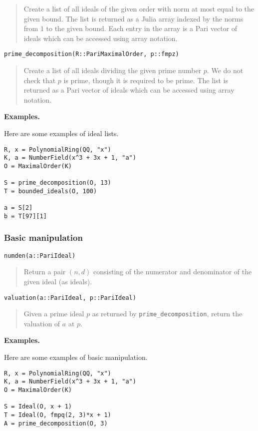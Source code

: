 \documentclass[a4paper,10pt]{article}
\newcommand{\code}{\lstinline}
\newcommand{\desc}[1]{\vspace{-3mm}\begin{quote}#1\end{quote}}
\begin{document}
{{\desc{Create a list of all ideals of the given order with norm at most equal to the
given bound. The list is returned as a Julia array indexed by the norms from $1$ to
the given bound. Each entry in the array is a Pari vector of ideals which can be
accessed using array notation.}

\begin{lstlisting}
prime_decomposition(R::PariMaximalOrder, p::fmpz)
\end{lstlisting}

\desc{Create a list of all ideals dividing the given prime number $p$. We do not
check that $p$ is prime, though it is required to be prime. The list is returned
as a Pari vector of ideals which can be accessed using array notation.}

\textbf{Examples.}

Here are some examples of ideal lists.

\begin{lstlisting}
R, x = PolynomialRing(QQ, "x")
K, a = NumberField(x^3 + 3x + 1, "a")
O = MaximalOrder(K)

S = prime_decomposition(O, 13)
T = bounded_ideals(O, 100)

a = S[2]
b = T[97][1]
\end{lstlisting}

\subsubsection{Basic manipulation}

\begin{lstlisting}
numden(a::PariIdeal)
\end{lstlisting}

\desc{Return a pair $(n, d)$ consisting of the numerator and denominator
of the given ideal (as ideals).}

\begin{lstlisting}
valuation(a::PariIdeal, p::PariIdeal)
\end{lstlisting}

\desc{Given a prime ideal $p$ as returned by \code{prime_decomposition}, return
the valuation of $a$ at $p$.}

\textbf{Examples.}

Here are some examples of basic manipulation.

\begin{lstlisting}
R, x = PolynomialRing(QQ, "x")
K, a = NumberField(x^3 + 3x + 1, "a")
O = MaximalOrder(K)

S = Ideal(O, x + 1)
T = Ideal(O, fmpq(2, 3)*x + 1)
A = prime_decomposition(O, 3)


\end{lstlisting}}}
\end{document}

